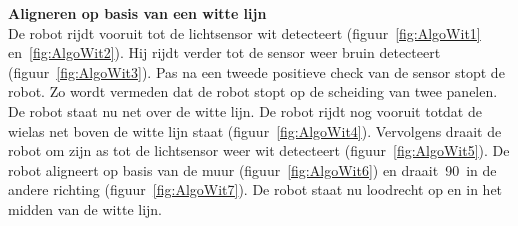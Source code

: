 \documentclass[tt3]{penoverslag}
\begin{document}
\begin{description}

\item \textbf{Aligneren op basis van een witte lijn}\\
De robot rijdt vooruit tot de lichtsensor wit detecteert (figuur~\ref{fig:AlgoWit1} en~\ref{fig:AlgoWit2}). Hij rijdt verder tot de sensor weer bruin detecteert (figuur~\ref{fig:AlgoWit3}). Pas na een tweede positieve check van de sensor stopt de robot. Zo wordt vermeden dat de robot stopt op de scheiding van twee panelen. De robot staat nu net over de witte lijn. De robot rijdt nog vooruit totdat de wielas net boven de witte lijn staat (figuur~\ref{fig:AlgoWit4}). Vervolgens draait de robot om zijn as tot de lichtsensor weer wit detecteert (figuur~\ref{fig:AlgoWit5}). De robot aligneert op basis van de muur (figuur~\ref{fig:AlgoWit6}) en draait~90\degree~in de andere richting (figuur~\ref{fig:AlgoWit7}). De robot staat nu loodrecht op en in het midden van de witte lijn.


\end{description}
\end{document}
